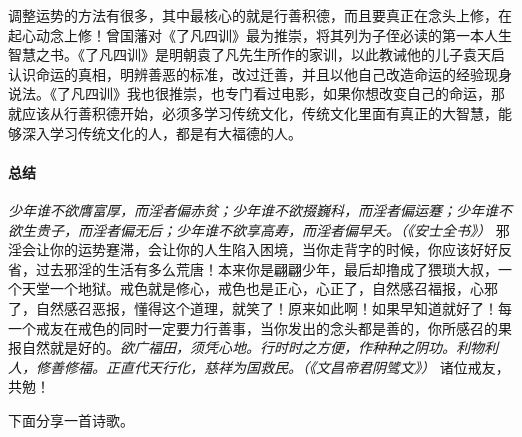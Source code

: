 调整运势的方法有很多，其中最核心的就是行善积德，而且要真正在念头上修，在起心动念上修！曾国藩对《了凡四训》最为推崇，将其列为子侄必读的第一本人生智慧之书。《了凡四训》是明朝袁了凡先生所作的家训，以此教诫他的儿子袁天启认识命运的真相，明辨善恶的标准，改过迁善，并且以他自己改造命运的经验现身说法。《了凡四训》我也很推崇，也专门看过电影，如果你想改变自己的命运，那就应该从行善积德开始，必须多学习传统文化，传统文化里面有真正的大智慧，能够深入学习传统文化的人，都是有大福德的人。

\paragraph*{总结}

\textit{少年谁不欲膺富厚，而淫者偏赤贫；少年谁不欲掇巍科，而淫者偏运蹇；少年谁不欲生贵子，而淫者偏无后；少年谁不欲享高寿，而淫者偏早夭。（《安士全书》）} 邪淫会让你的运势蹇滞，会让你的人生陷入困境，当你走背字的时候，你应该好好反省，过去邪淫的生活有多么荒唐！本来你是翩翩少年，最后却撸成了猥琐大叔，一个天堂一个地狱。戒色就是修心，戒色也是正心，心正了，自然感召福报，心邪了，自然感召恶报，懂得这个道理，就笑了！原来如此啊！如果早知道就好了！每一个戒友在戒色的同时一定要力行善事，当你发出的念头都是善的，你所感召的果报自然就是好的。\textit{欲广福田，须凭心地。行时时之方便，作种种之阴功。利物利人，修善修福。正直代天行化，慈祥为国救民。（《文昌帝君阴骘文》）} 诸位戒友，共勉！

下面分享一首诗歌。

